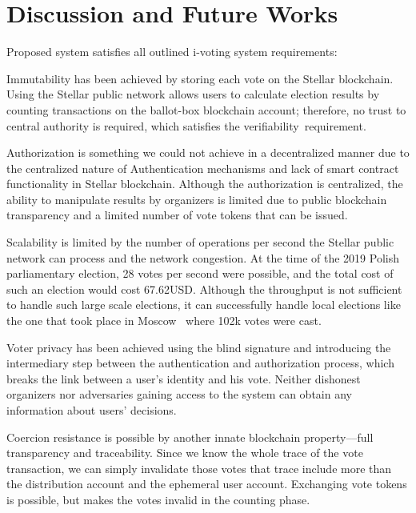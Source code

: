 \documentclass[applsci,article,accept,moreauthors,pdftex]{Definitions/mdpi}
\begin{document}

\section{Discussion and Future Works}
\label{discussion}

Proposed system satisfies all outlined i-voting system requirements: 

Immutability has been achieved by storing each vote on the Stellar blockchain. Using the Stellar public network allows users to calculate election results by counting transactions on the ballot-box blockchain account; therefore, no trust to central authority is required, which satisfies the verifiability~requirement. 

Authorization is something we could not achieve in a decentralized manner due to the centralized nature of Authentication mechanisms and lack of smart contract functionality in Stellar blockchain. Although the authorization is centralized, the ability to manipulate results by organizers is limited due to public blockchain transparency and a limited number of vote tokens that can be issued. 

Scalability is limited by the number of operations per second the Stellar public network can process and the network congestion. At the time of the 2019 Polish parliamentary election, 28 votes per second were possible, and the total cost of such an election would cost 67.62USD.  Although the throughput is not sufficient to handle such large scale elections, it can successfully handle local elections like the one that took place in Moscow~\cite{gaudry2019breaking} where 102k votes were cast. 

Voter privacy has been achieved using the blind signature and introducing the intermediary step between the authentication and authorization process, which breaks the link between a user's identity and his vote. Neither dishonest organizers nor adversaries gaining access to the system can obtain any information about users' decisions. 

Coercion resistance is possible by another innate blockchain property––full transparency and traceability. Since we know the whole trace of the vote transaction, we can simply invalidate those votes that trace include more than the distribution account and the ephemeral user account. Exchanging vote tokens is possible, but makes the votes invalid in the counting phase.
\end{document}
